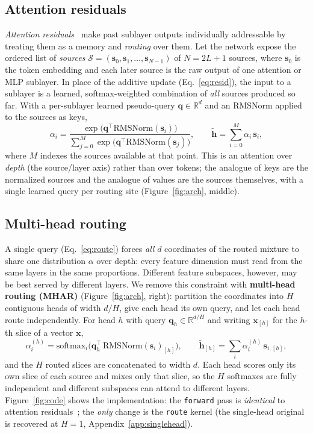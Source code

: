 \documentclass{article}
\begin{document}
\subsection{Attention residuals}
\emph{Attention residuals}~\citep{kimi2025attention} make past sublayer outputs
individually addressable by treating them as a memory and \emph{routing} over
them. Let the network expose the ordered list of \emph{sources}
$\mathcal{S} = (\mathbf{s}_0, \mathbf{s}_1, \dots, \mathbf{s}_{N-1})$ of $N{=}2L{+}1$
sources, where $\mathbf{s}_0$ is the token embedding and each later source is the raw
output of one attention or MLP sublayer. In place of the additive update
(Eq.~\ref{eq:resid}), the input to a sublayer is a learned, softmax-weighted
combination of \emph{all} sources produced so far. With a per-sublayer learned
pseudo-query $\mathbf{q}\in\mathbb{R}^{d}$ and an RMSNorm applied to the sources
as keys,
\begin{equation}
\alpha_i = \frac{\exp\!\big(\mathbf{q}^\top \mathrm{RMSNorm}(\mathbf{s}_i)\big)}
{\sum_{j=0}^{M}\exp\!\big(\mathbf{q}^\top \mathrm{RMSNorm}(\mathbf{s}_j)\big)},
\qquad
\tilde{\mathbf{h}} = \sum_{i=0}^{M} \alpha_i\,\mathbf{s}_i ,
\label{eq:route}
\end{equation}
where $M$ indexes the sources available at that point. This is an attention over
\emph{depth} (the source/layer axis) rather than over tokens; the analogue of
keys are the normalized sources and the analogue of values are the sources
themselves, with a single learned query per routing site (Figure~\ref{fig:arch}, middle).

\subsection{Multi-head routing}
A single query (Eq.~\ref{eq:route}) forces \emph{all} $d$ coordinates of the
routed mixture to share one distribution $\alpha$ over depth: every feature
dimension must read from the same layers in the same proportions. Different
feature subspaces, however, may be best served by different layers. We remove
this constraint with \textbf{multi-head routing (MHAR)} (Figure~\ref{fig:arch}, right):
partition the
coordinates into $H$ contiguous heads of width $d/H$, give each head its own
query, and let each head route independently. For head $h$ with
query $\mathbf{q}_h\in\mathbb{R}^{d/H}$ and writing $\mathbf{x}_{[h]}$ for the
$h$-th slice of a vector $\mathbf{x}$,
\begin{equation}
\alpha^{(h)}_i = \mathrm{softmax}_i\!\Big(\mathbf{q}_h^\top\,\mathrm{RMSNorm}(\mathbf{s}_i)_{[h]}\Big),
\qquad
\tilde{\mathbf{h}}_{[h]} = \sum_{i} \alpha^{(h)}_i\,\mathbf{s}_{i,[h]},
\label{eq:mh}
\end{equation}
and the $H$ routed slices are concatenated to width $d$. Each head scores only
its own slice of each source and mixes only that slice, so the $H$ softmaxes are
fully independent and different subspaces can attend to different layers.
Figure~\ref{fig:code} shows the implementation: the \texttt{forward} pass is
\emph{identical} to attention residuals~\citep{kimi2025attention}; the \emph{only} change
is the \texttt{route} kernel (the single-head original is recovered at $H{=}1$,
Appendix~\ref{app:singlehead}).
\end{document}
